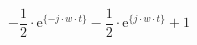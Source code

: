 \[
-\frac{1}{2}\cdot\textrm{e}^{\{- j \cdot w \cdot t \}}
-\frac{1}{2}\cdot\textrm{e}^{\{ j \cdot w \cdot t \}}
+1
\]
